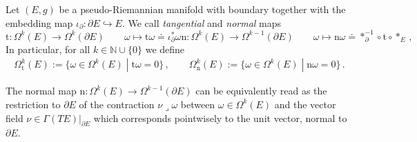 \begin{Definition}\label{Def: tangential and normal component}
	Let $(E,g)$ be a pseudo-Riemannian manifold with boundary together with the embedding map $\iota_{\partial}:\partial E\hookrightarrow E$. We call {\em tangential} and {\em normal} maps 
	\begin{subequations}\label{Eqn: tangential and normal maps}
		\begin{equation}\label{Eqn: tangential map}
		\mathrm{t}\colon\Omega^k(E)\to\Omega^k(\partial E)\qquad\omega\mapsto\mathrm{t}\omega\doteq\iota_{\partial}^*\omega
		\end{equation}
		\begin{equation}\label{Eqn: normal maps}
		\mathrm{n}\colon\Omega^k(E)\to\Omega^{k-1}(\partial E)\qquad\omega\mapsto\mathrm{n}\omega\doteq\ast_{\partial}^{-1}\circ\mathrm{t}\circ\ast_E\,,
		\end{equation}
	\end{subequations}
	In particular, for all $k\in\mathbb{N}\cup\{0\}$ we define
	\begin{align}\label{Eqn: k-forms with vanishing tangential or normal component}
	\Omega_{\mathrm{t}}^k(E):=\lbrace\omega\in\Omega^k(E)\;|\;\mathrm{t}\omega=0\rbrace\,,\qquad
	\Omega_{\mathrm{n}}^k(E):=\lbrace\omega\in\Omega^k(E)\;|\;\mathrm{n}\omega=0\rbrace\,.
	\end{align}
\end{Definition}

\begin{remark}
	The normal map $\mathrm{n}:\Omega^k(E)\to\Omega^{k-1}(\partial E)$ can be equivalently read as the restriction to $\partial E$ of the contraction $\nu\operatorname{\lrcorner}\omega$ between $\omega\in\Omega^k(E)$ and the vector field $\nu\in\Gamma(TE)|_{\partial E}$ which corresponds pointwisely to the unit vector, normal to $\partial E$.
\end{remark}

